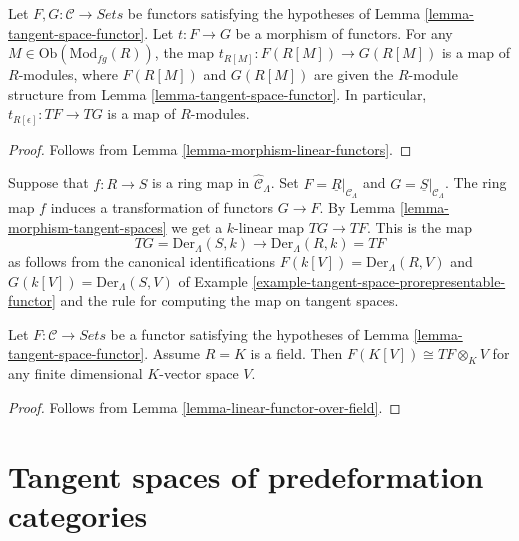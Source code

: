 \begin{lemma}
\label{lemma-morphism-tangent-spaces}
Let $F, G: \mathcal{C} \to \textit{Sets}$ be functors satisfying 
the hypotheses of
Lemma \ref{lemma-tangent-space-functor}.
Let $t : F \to G$ be a morphism of functors. For any
$M \in \text{Ob}(\text{Mod}_{fg}(R))$, the map
$t_{R[M]}: F(R[M]) \to G(R[M])$ is a map of $R$-modules, where
$F(R[M])$ and $G(R[M])$ are given the $R$-module structure from
Lemma \ref{lemma-tangent-space-functor}.  
In particular, $t_{R[\epsilon]} : TF \to TG$ is a map of $R$-modules.
\end{lemma}

\begin{proof}
Follows from
Lemma \ref{lemma-morphism-linear-functors}.
\end{proof}

\begin{example}
\label{example-tangent-space-map-prorepresentable-functor}
Suppose that $f : R \to S$ is a ring map in $\widehat{\mathcal{C}}_\Lambda$.
Set $F = \underline{R}|_{\mathcal{C}_\Lambda}$ and
$G = \underline{S}|_{\mathcal{C}_\Lambda}$. The ring map
$f$ induces a transformation of functors $G \to F$. By
Lemma \ref{lemma-morphism-tangent-spaces}
we get a $k$-linear map $TG \to TF$. This is the map
$$
TG = \text{Der}_\Lambda(S, k) \longrightarrow \text{Der}_\Lambda(R, k) = TF
$$
as follows from the canonical identifications
$F(k[V]) = \text{Der}_\Lambda(R, V)$ and
$G(k[V]) = \text{Der}_\Lambda(S, V)$ of
Example \ref{example-tangent-space-prorepresentable-functor}
and the rule for computing the map on tangent spaces.
\end{example}

\begin{lemma}
\label{lemma-tangent-space-tensor}
Let $F: \mathcal{C} \to \textit{Sets}$ be a functor satisfying the 
hypotheses of
Lemma \ref{lemma-tangent-space-functor}.
Assume $R = K$ is a field. Then $F(K[V]) \cong TF \otimes_K V$
for any finite dimensional $K$-vector space $V$.
\end{lemma}

\begin{proof}
Follows from
Lemma \ref{lemma-linear-functor-over-field}.
\end{proof}






\section{Tangent spaces of predeformation categories}
\label{section-tangent-spaces}


